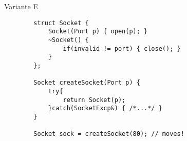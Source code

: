 \begin{frame}[fragile]{ Variante E }
	\begin{lstlisting}
		struct Socket {
			Socket(Port p) { open(p); }
			~Socket() {
				if(invalid != port) { close(); }
			}
		};
		
		Socket createSocket(Port p) {
			try{
				return Socket(p);
			}catch(SocketExcp&) { /*...*/ }
		}
		
		Socket sock = createSocket(80);	// moves!
		
	\end{lstlisting}
\end{frame}

